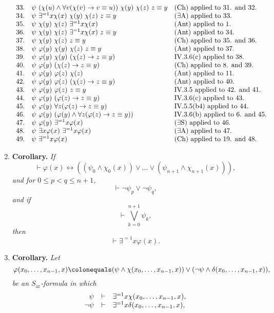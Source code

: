 \documentclass[leqno]{report}
\newcommand{\ar}{\mathrm{ar}}
\newcommand{\ant}{{(\mathrm{Ant})}}
\newcommand{\ea}{{(\exists\mathrm{A})}}
\newcommand{\es}{{(\exists\mathrm{S})}}
\begin{document}
\begin{enumerate}[1.]
\[\begin{array}{rll}
33. & \psi \ (\chi(u) \land \forall v (\chi(v) \rightarrow v \equiv u)) \ \chi(y) \ \chi(z) \ z \equiv y & \mbox{(Ch) applied to 31. and 32.} \cr
34. & \psi \ \exists^{=1} x \chi(x) \ \chi(y) \ \chi(z) \ z \equiv y & \mbox{$\ea$ applied to 33.} \cr
35. & \psi \ \chi(y) \ \chi(z) \ \exists^{=1} x \chi(x) & \mbox{$\ant$ applied to 1.} \cr
36. & \psi \ \chi(y) \ \chi(z) \ \exists^{=1} x \chi(x) \ z \equiv y & \mbox{$\ant$ applied to 34.} \cr
37. & \psi \ \chi(y) \ \chi(z) \ z \equiv y & \mbox{(Ch) applied to 35. and 36.} \cr
38. & \psi \ \varphi(y) \ \chi(y) \ \chi(z) \ z \equiv y & \mbox{$\ant$ applied to 37.} \cr
39. & \psi \ \varphi(y) \ \chi(y) \ (\chi(z) \rightarrow z \equiv y) & \mbox{IV.3.6(c) applied to 38.} \cr
40. & \psi \ \varphi(y) \ (\chi(z) \rightarrow z \equiv y) & \mbox{(Ch) applied to 8. and 39.} \cr
41. & \psi \ \varphi(y) \ \varphi(z) \ \chi(z) & \mbox{$\ant$ applied to 11.} \cr
42. & \psi \ \varphi(y) \ \varphi(z) \ (\chi(z) \rightarrow z \equiv y) & \mbox{$\ant$ applied to 40.} \cr
43. & \psi \ \varphi(y) \ \varphi(z) \ z \equiv y & \mbox{IV.3.5 applied to 42. and 41.} \cr
44. & \psi \ \varphi(y) \ (\varphi(z) \rightarrow z \equiv y) & \mbox{IV.3.6(c) applied to 43.} \cr
45. & \psi \ \varphi(y) \ \forall z (\varphi(z) \rightarrow z \equiv y) & \mbox{IV.5.5(b4) applied to 44.} \cr
46. & \psi \ \varphi(y) \ (\varphi(y) \land \forall z (\varphi(z) \rightarrow z \equiv y)) & \mbox{IV.3.6(b) applied to 6. and 45.} \cr
47. & \psi \ \varphi(y) \ \exists^{=1} x \varphi(x) & \mbox{$\es$ applied to 46.} \cr
48. & \psi \ \exists x \varphi(x) \ \exists^{=1} x \varphi(x) & \mbox{$\ea$ applied to 47.} \cr
49. & \psi \ \exists^{=1} x \varphi(x) & \mbox{(Ch) applied to 19. and 48.}
\end{array}
\]
%
\item \textbf{Corollary.} \emph{If
\[
\vdash \varphi (x) \leftrightarrow ((\psi_0 \land \chi_0 (x)) \lor \ldots \lor (\psi_{n + 1} \land \chi_{n + 1} (x))),
\]
and for $0 \leq p < q \leq n + 1$,
\[
\vdash \neg\psi_p \lor \neg\psi_q,
\]
and if
\[
\vdash \bigvee_{k = 0}^{n + 1} \psi_k,
\]
then
\[
\vdash \exists^{=1} x \varphi (x).
\]
}
%
\item \textbf{Corollary.} \emph{Let
\[
\varphi (x_0, \ldots, x_{n - 1}, x) \colonequals (\psi \land \chi (x_0, \ldots, x_{n - 1}, x)) \lor (\neg\psi \land \delta (x_0, \ldots, x_{n - 1}, x)),
\]
be an $S_\ar$-formula in which
\[
\begin{array}{rll}
\psi & \vdash & \exists^{=1} x \chi (x_0, \ldots, x_{n - 1}, x), \cr
\neg\psi & \vdash & \exists^{=1} x \delta (x_0, \ldots, x_{n - 1}, x),

\end{array}\]}
\end{enumerate}
\end{document}
